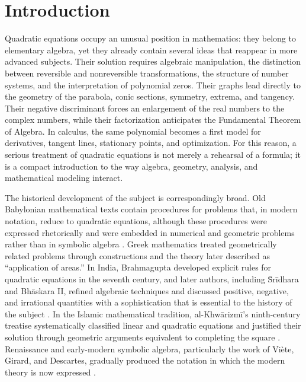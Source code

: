 \section{Introduction}

Quadratic equations occupy an unusual position in mathematics: they belong to elementary algebra, yet they already contain several ideas that reappear in more advanced subjects. Their solution requires algebraic manipulation, the distinction between reversible and nonreversible transformations, the structure of number systems, and the interpretation of polynomial zeros. Their graphs lead directly to the geometry of the parabola, conic sections, symmetry, extrema, and tangency. Their negative discriminant forces an enlargement of the real numbers to the complex numbers, while their factorization anticipates the Fundamental Theorem of Algebra. In calculus, the same polynomial becomes a first model for derivatives, tangent lines, stationary points, and optimization. For this reason, a serious treatment of quadratic equations is not merely a rehearsal of a formula; it is a compact introduction to the way algebra, geometry, analysis, and mathematical modeling interact.

The historical development of the subject is correspondingly broad. Old Babylonian mathematical texts contain procedures for problems that, in modern notation, reduce to quadratic equations, although these procedures were expressed rhetorically and were embedded in numerical and geometric problems rather than in symbolic algebra \cite{robson2008,katz2009}. Greek mathematics treated geometrically related problems through constructions and the theory later described as ``application of areas.'' In India, Brahmagupta developed explicit rules for quadratic equations in the seventh century, and later authors, including \=Sr\={i}dhara and Bh\={a}skara II, refined algebraic techniques and discussed positive, negative, and irrational quantities with a sophistication that is essential to the history of the subject \cite{plofker2009,colebrooke1817}. In the Islamic mathematical tradition, al-Khw\={a}rizm\={i}'s ninth-century treatise systematically classified linear and quadratic equations and justified their solution through geometric arguments equivalent to completing the square \cite{rosen1831,swetzkatz2011}. Renaissance and early-modern symbolic algebra, particularly the work of Vi\`ete, Girard, and Descartes, gradually produced the notation in which the modern theory is now expressed \cite{boyer2011,katz2009}.

